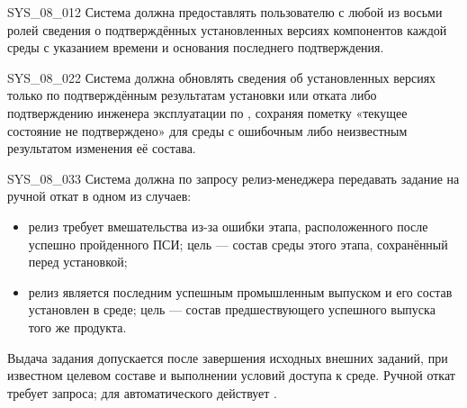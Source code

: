 \documentclass{tpks}
\begin{document}
\begin{req}{SYS_08_01}{2}
Система должна предоставлять пользователю с любой из восьми ролей сведения о подтверждённых установленных версиях компонентов каждой среды с указанием времени и основания последнего подтверждения.
\end{req}

\begin{req}{SYS_08_02}{2}
Система должна обновлять сведения об установленных версиях только по подтверждённым
результатам установки или отката либо подтверждению инженера эксплуатации
по , сохраняя пометку «текущее состояние не подтверждено»
для среды с ошибочным либо неизвестным результатом изменения её состава.
\end{req}

\begin{req}{SYS_08_03}{3}
Система должна по запросу релиз-менеджера передавать задание на ручной откат в одном из случаев:
\begin{itemize}
\item релиз требует вмешательства из-за ошибки этапа, расположенного после успешно
пройденного ПСИ; цель --- состав среды этого этапа, сохранённый перед установкой;
\item релиз является последним успешным промышленным выпуском и его состав установлен
в среде; цель --- состав предшествующего успешного выпуска того же продукта.
\end{itemize}
Выдача задания допускается после завершения исходных внешних заданий, при известном
целевом составе и выполнении условий доступа к среде. Ручной откат требует запроса;
для автоматического действует .
\end{req}
\end{document}

